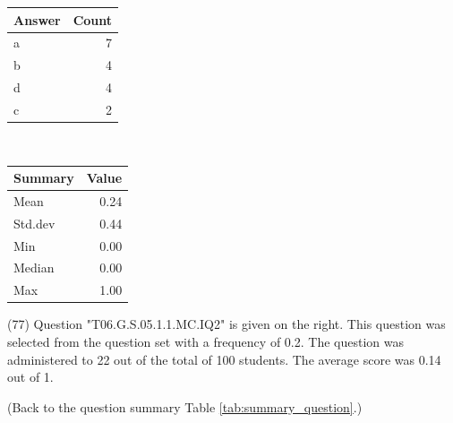 \documentclass[12pt,nohyper]{tufte-handout}\usepackage[]{graphicx}\usepackage[]{color}
\begin{document}
\begin{center}%
\begin{tabular}{lr}
  \hline
Answer & Count \\ 
  \hline
a &   7 \\ 
  b &   4 \\ 
  d &   4 \\ 
  c &   2 \\ 
   \hline
\end{tabular}
~~~~~~~~%
\begin{tabular}{lr}
  \hline
Summary & Value \\ 
  \hline
Mean & 0.24 \\ 
  Std.dev & 0.44 \\ 
  Min & 0.00 \\ 
  Median & 0.00 \\ 
  Max & 1.00 \\ 
   \hline
\end{tabular}
\end{center}\newpage{} (77) Question "T06.G.S.05.1.1.MC.IQ2" is given on the right. This question was selected from the question set with a frequency of 0.2. The question was administered to 22 out of the total of 100 students. The average score was 0.14 out of 1.

 (Back to the question summary Table \ref{tab:summary_question}.)
\end{document}
